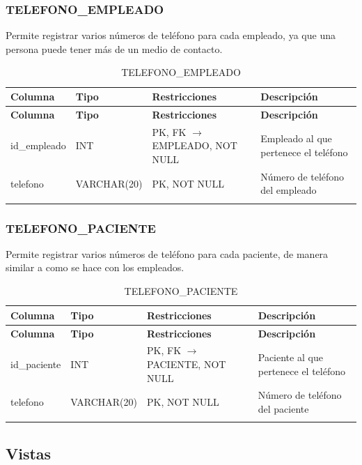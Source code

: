 \documentclass[12pt,a4paper]{article}
\begin{document}
\subsubsection{TELEFONO\_EMPLEADO}
Permite registrar varios n\'umeros de tel\'efono para cada empleado, ya que una persona puede tener m\'as de un medio de contacto.

{\small\begin{longtable}{|p{2.3cm}|p{3.3cm}|p{4.2cm}|p{4.2cm}|}
\hline
\textbf{Columna} & \textbf{Tipo} & \textbf{Restricciones} & \textbf{Descripci\'on} \\ \hline
\endfirsthead
\hline
\textbf{Columna} & \textbf{Tipo} & \textbf{Restricciones} & \textbf{Descripci\'on} \\ \hline
\endhead
id\_empleado & INT & PK, FK $\rightarrow$ EMPLEADO, NOT NULL & Empleado al que pertenece el tel\'efono \\ \hline
telefono & VARCHAR(20) & PK, NOT NULL & N\'umero de tel\'efono del empleado \\ \hline
\caption{TELEFONO\_EMPLEADO}
\end{longtable}}

\subsubsection{TELEFONO\_PACIENTE}
Permite registrar varios n\'umeros de tel\'efono para cada paciente, de manera similar a como se hace con los empleados.

{\small\begin{longtable}{|p{2.3cm}|p{3.3cm}|p{4.2cm}|p{4.2cm}|}
\hline
\textbf{Columna} & \textbf{Tipo} & \textbf{Restricciones} & \textbf{Descripci\'on} \\ \hline
\endfirsthead
\hline
\textbf{Columna} & \textbf{Tipo} & \textbf{Restricciones} & \textbf{Descripci\'on} \\ \hline
\endhead
id\_paciente & INT & PK, FK $\rightarrow$ PACIENTE, NOT NULL & Paciente al que pertenece el tel\'efono \\ \hline
telefono & VARCHAR(20) & PK, NOT NULL & N\'umero de tel\'efono del paciente \\ \hline
\caption{TELEFONO\_PACIENTE}
\end{longtable}}

\newpage

\subsection{Vistas}
\end{document}
